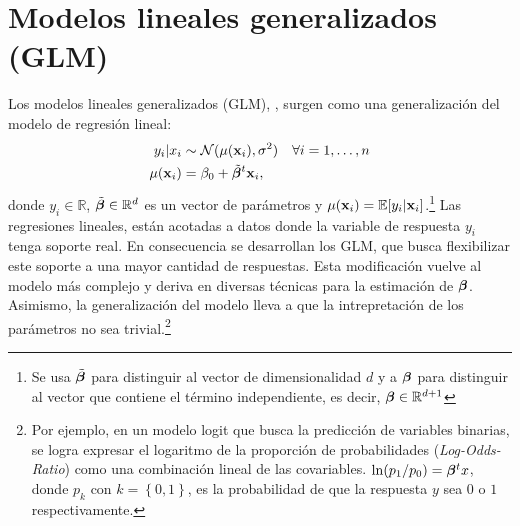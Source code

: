 \documentclass[../Main/Main.tex]{subfiles}
\begin{document}
\section{Modelos lineales generalizados (GLM)} \label{sec:GLM}
Los modelos lineales generalizados (GLM), \citet{maccullagh1989generalized}, surgen como una generalización del modelo de regresión lineal:
\begin{align*}
	y_i|x_i &\sim \mathcal{N}(\mu(\mathbf{x}_i), \sigma^2)  \quad \forall i = 1,\ldots,n\\
	\mu(\mathbf{x}_i) &= \beta_0 + \tilde{\bm{\beta}}^t\mathbf{x}_i,
\end{align*}
donde $y_i \in\mathbb{R}$, $\tilde{\bm{\beta}} \in \mathbb{R}^{d}$ es un vector de parámetros y $\mu(\mathbf{x}_i) = \mathbb{E}[y_i|\mathbf{x}_i]$.\footnote{Se usa $\tilde{\bm{\beta}}$ para distinguir al vector de dimensionalidad $d$ y a $\bm{\beta}$ para distinguir al vector que contiene el término independiente, es decir, $\bm{\beta}\in \mathbb{R}^{d+1}$} Las regresiones lineales, están acotadas a datos donde la variable de respuesta $y_i$ tenga soporte real. En consecuencia se desarrollan los GLM, que busca flexibilizar este soporte a una mayor cantidad de respuestas. Esta modificación vuelve al modelo más complejo y deriva en diversas técnicas para la estimación de $\bm{\beta}$. Asimismo, la generalización del modelo lleva a que la intrepretación de los parámetros no sea trivial.\footnote{Por ejemplo, en un modelo logit que busca la predicción de variables binarias, se logra expresar el logaritmo de la proporción de probabilidades (\textit{Log-Odds-Ratio}) como una combinación lineal de las covariables. $\ln(p_1 / p_0) = \bm{\beta}^t x$, donde $p_k$ con  $k = \left\{0,1\right\}$, es la probabilidad de que la respuesta $y$ sea $0$ o $1$ respectivamente.}\\
\end{document}
